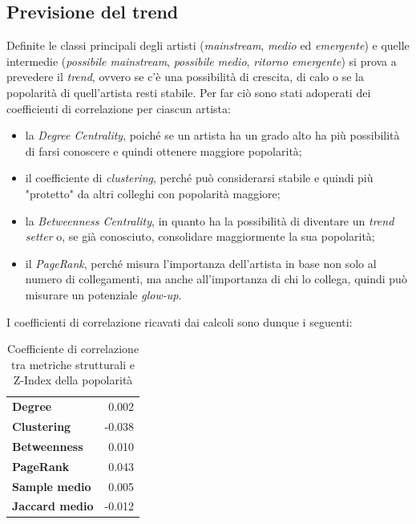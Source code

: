 \documentclass[sigchi]{acmart}
\begin{document}
\subsection{Previsione del trend}

Definite le classi principali degli artisti ({\itshape mainstream}, {\itshape medio} ed {\itshape emergente}) e quelle intermedie ({\itshape possibile mainstream}, {\itshape possibile medio}, {\itshape ritorno emergente}) si prova a prevedere il {\itshape trend}, ovvero se c'è una possibilità di crescita, di calo o se la popolarità di quell'artista resti stabile. Per far ciò sono stati adoperati dei coefficienti di correlazione per ciascun artista:

\begin{itemize}
\item la {\itshape Degree Centrality}, poiché se un artista ha un grado alto ha più possibilità di farsi conoscere e quindi ottenere maggiore popolarità;
\item il coefficiente di {\itshape clustering}, perché può considerarsi stabile e quindi più "protetto" da altri colleghi con popolarità maggiore;
\item la {\itshape Betweenness Centrality}, in quanto ha la possibilità di diventare un {\itshape trend setter} o, se già conosciuto, consolidare maggiormente la sua popolarità;
\item il {\itshape PageRank}, perché misura l'importanza dell'artista in base non solo al numero di collegamenti, ma anche all'importanza di chi lo collega, quindi può misurare un potenziale {\itshape glow-up}.
\end{itemize}

I coefficienti di correlazione ricavati dai calcoli sono dunque i seguenti:

\begin{table}[H]
\centering
\small
\begin{tabular}{l r}
\hline
\textbf{Degree} & 0.002 \\
\textbf{Clustering} & -0.038 \\
\textbf{Betweenness} & 0.010 \\
\textbf{PageRank} & 0.043 \\
\textbf{Sample medio} & 0.005 \\
\textbf{Jaccard medio} & -0.012 \\
\hline
\end{tabular}
\caption{Coefficiente di correlazione tra metriche strutturali e Z-Index della popolarità}
\label{tab:corrMetrics}
\end{table}
\end{document}
